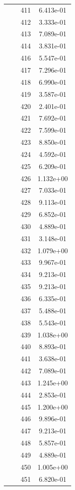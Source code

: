 \documentclass[12pt]{article}
\begin{document}
\begin{longtable}{@{}cccc@{}}
 &  & 411 & 6.413e-01 \\
 &  & 412 & 3.333e-01 \\
 &  & 413 & 7.089e-01 \\
 &  & 414 & 3.831e-01 \\
 &  & 416 & 5.547e-01 \\
 &  & 417 & 7.296e-01 \\
 &  & 418 & 6.990e-01 \\
 &  & 419 & 3.587e-01 \\
 &  & 420 & 2.401e-01 \\
 &  & 421 & 7.692e-01 \\
 &  & 422 & 7.599e-01 \\
 &  & 423 & 8.850e-01 \\
 &  & 424 & 4.592e-01 \\
 &  & 425 & 6.209e-01 \\
 &  & 426 & 1.132e+00 \\
 &  & 427 & 7.033e-01 \\
 &  & 428 & 9.113e-01 \\
 &  & 429 & 6.852e-01 \\
 &  & 430 & 4.889e-01 \\
 &  & 431 & 3.148e-01 \\
 &  & 432 & 1.079e+00 \\
 &  & 433 & 9.967e-01 \\
 &  & 434 & 9.213e-01 \\
 &  & 435 & 9.213e-01 \\
 &  & 436 & 6.335e-01 \\
 &  & 437 & 5.488e-01 \\
 &  & 438 & 5.543e-01 \\
 &  & 439 & 1.038e+00 \\
 &  & 440 & 8.893e-01 \\
 &  & 441 & 3.638e-01 \\
 &  & 442 & 7.089e-01 \\
 &  & 443 & 1.245e+00 \\
 &  & 444 & 2.853e-01 \\
 &  & 445 & 1.200e+00 \\
 &  & 446 & 9.896e-01 \\
 &  & 447 & 9.213e-01 \\
 &  & 448 & 5.857e-01 \\
 &  & 449 & 4.889e-01 \\
 &  & 450 & 1.005e+00 \\
 &  & 451 & 6.820e-01 \\

\end{longtable}
\end{document}
